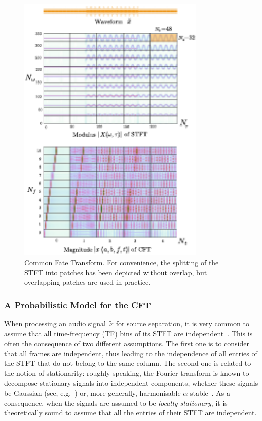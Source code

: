 \begin{figure}[t]
\centering
\includegraphics[width=0.8\textwidth]{Chapters/06_Separation_Unknown/figures/CFT}

\caption{Common Fate Transform. For convenience, the splitting of the STFT
into patches has been depicted without overlap, but overlapping patches
are used in practice\label{fig:CFT}.}
\end{figure}

\subsubsection{A Probabilistic Model for the CFT}

\label{ssub:separation}

When processing an audio signal~$\tilde{x}$ for source separation,
it is very common to assume that all time-frequency (TF) bins
of its STFT are independent~\cite{fevotte09,duong10,ozerov12,liutkus11t}.
This is often the consequence of two different assumptions.
The first one is to consider that all frames are independent, thus
leading to the independence of all entries of the STFT that do not belong to the
same column. The second one is related to the notion of stationarity:
roughly speaking, the Fourier transform is known to decompose stationary
signals into independent components, whether these signals be Gaussian
(see, e.g.~\cite{liutkus11t}) or, more generally, harmonisable $\alpha$-stable~\cite{liutkus15}.
As a consequence, when the signals are assumed to be \emph{locally stationary},
it is theoretically sound to assume that all the entries of
their STFT are independent.


